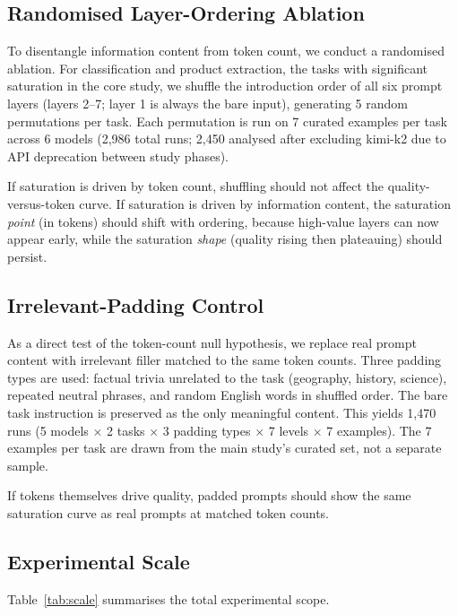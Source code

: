 \subsection{Randomised Layer-Ordering Ablation}
\label{sec:ablation}

To disentangle information content from token count, we conduct a randomised
ablation.
For classification and product extraction, the tasks with significant
saturation in the core study, we shuffle the introduction order of all
six prompt layers (layers 2--7; layer 1 is always the bare input),
generating 5 random permutations per task.
Each permutation is run on 7 curated examples per task across 6 models
(2,986 total runs; 2,450 analysed after excluding kimi-k2 due to API
deprecation between study phases).

If saturation is driven by token count, shuffling should not affect the
quality-versus-token curve.
If saturation is driven by information content, the saturation \emph{point}
(in tokens) should shift with ordering, because high-value layers can now
appear early, while the saturation \emph{shape} (quality rising then
plateauing) should persist.

\subsection{Irrelevant-Padding Control}
\label{sec:padding}

As a direct test of the token-count null hypothesis, we replace real prompt
content with irrelevant filler matched to the same token counts.
Three padding types are used: factual trivia unrelated to the task
(geography, history, science), repeated neutral phrases, and random
English words in shuffled order.
The bare task instruction is preserved as the only meaningful content.
This yields 1,470 runs (5 models $\times$ 2 tasks $\times$ 3 padding types
$\times$ 7 levels $\times$ 7 examples).
The 7 examples per task are drawn from the main study's curated set, not a
separate sample.

If tokens themselves drive quality, padded prompts should show the same
saturation curve as real prompts at matched token counts.

\subsection{Experimental Scale}
\label{sec:scale}

Table~\ref{tab:scale} summarises the total experimental scope.

